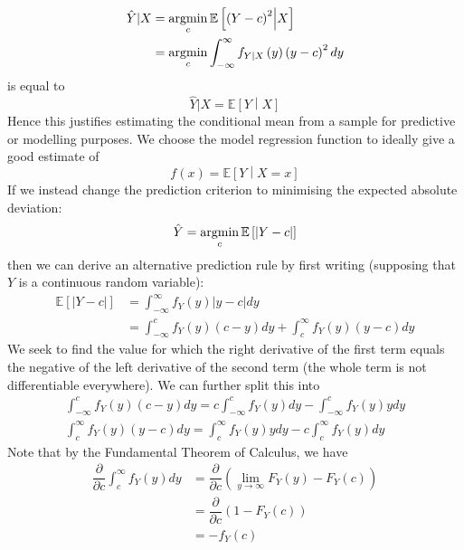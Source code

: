 \documentclass[11pt]{report} %
\begin{document}
\begin{align}
\hat{Y}|X &= \operatorname*{argmin}_{c}\mathbb{E}\left[\left(Y - c\right)^{2}\middle|X\right] \\
&= \operatorname*{argmin}_{c}\int_{-\infty}^{\infty}f_{Y|X}\left(y\right)\left(y - c\right)^{2}dy
\end{align}
is equal to
\begin{equation}
\hat{Y}|X = \mathbb{E}\left[Y\middle|X\right]
\end{equation}
Hence this justifies estimating the conditional mean from a sample for predictive or modelling purposes. We choose the model regression function to ideally give a good estimate of
\begin{equation}
f\left(x\right) = \mathbb{E}\left[Y\middle| X = x\right]
\end{equation}
If we instead change the prediction criterion to minimising the expected absolute deviation:
\begin{equation}
\hat{Y} = \operatorname*{argmin}_{c}\mathbb{E}\left[\left|Y - c\right|\right]
\end{equation}
then we can derive an alternative prediction rule by first writing (supposing that $Y$ is a continuous random variable):
\begin{align}
\mathbb{E}\left[\left|Y - c\right|\right] &= \int_{-\infty}^{\infty}f_{Y}\left(y\right)\left|y - c\right|dy \\
&= \int_{-\infty}^{c}f_{Y}\left(y\right)\left(c - y\right)dy + \int_{c}^{\infty}f_{Y}\left(y\right)\left(y - c\right)dy
\end{align}
We seek to find the value for which the right derivative of the first term equals the negative of the left derivative of the second term (the whole term is not differentiable everywhere). We can further split this into
\begin{gather}
\int_{-\infty}^{c}f_{Y}\left(y\right)\left(c - y\right)dy = c\int_{-\infty}^{c}f_{Y}\left(y\right)dy - \int_{-\infty}^{c}f_{Y}\left(y\right)ydy \\
\int_{c}^{\infty}f_{Y}\left(y\right)\left(y - c\right)dy = \int_{c}^{\infty}f_{Y}\left(y\right)ydy - c\int_{c}^{\infty}f_{Y}\left(y\right)dy
\end{gather}
Note that by the Fundamental Theorem of Calculus, we have
\begin{align}
\dfrac{\partial }{\partial c}\int_{c}^{\infty}f_{Y}\left(y\right)dy &= \dfrac{\partial }{\partial c}\left(\lim_{y \to \infty}F_{Y}\left(y\right) - F_{Y}\left(c\right)\right) \\
&= \dfrac{\partial }{\partial c}\left(1 - F_{Y}\left(c\right)\right) \\
&= -f_{Y}\left(c\right)
\end{align}
\end{document}
